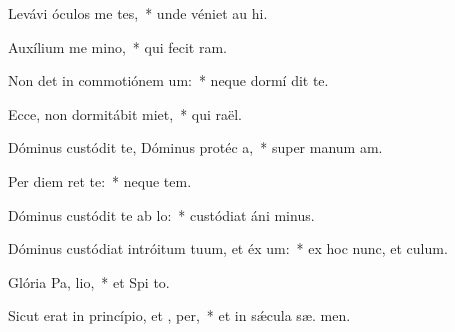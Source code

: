 \item Levávi óculos me  tes,~* unde véniet au hi.
\item Auxílium me  mino,~* qui fecit   ram.
\item Non det in commotiónem  um:~* neque dormí  dit te.
\item Ecce, non dormitábit  miet,~* qui  raël.
\item Dóminus custódit te, Dóminus protéc a,~* super manum  am.
\item Per diem   ret te:~* neque   tem.
\item Dóminus custódit te ab  lo:~* custódiat áni  minus.
\item Dóminus custódiat intróitum tuum, et éx um:~* ex hoc nunc, et   culum.
\item Glória Pa,  lio,~* et Spi to.
\item Sicut erat in princípio, et ,  per,~* et in sǽcula sæ. men.
